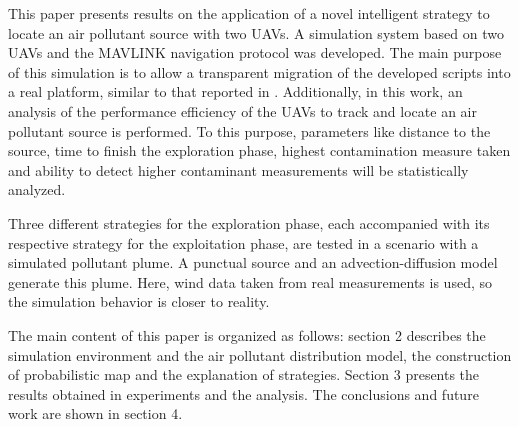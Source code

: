 This paper presents results on the application of a novel intelligent strategy to locate an air pollutant source with two UAVs.
A simulation system based on two UAVs and the MAVLINK navigation protocol \cite{koubaa2019micro} was developed. 
The main purpose of this simulation is to allow a transparent migration of the developed scripts into a real platform, similar to that reported in \cite{yungaicela2017design}.
Additionally, in this work, an analysis of the performance efficiency of the UAVs to track and locate an air pollutant source is performed.
To this purpose, parameters like distance to the source, time to finish the exploration phase, highest contamination measure taken and ability to detect higher contaminant measurements will be statistically analyzed.   

Three different strategies for the exploration phase, each accompanied with its respective strategy for the exploitation phase, are tested in a scenario with a simulated pollutant plume. 
A punctual source and an advection-diffusion model generate this plume.
Here, wind data taken from real measurements is used, so the simulation behavior is closer to reality.

The main content of this paper is organized as follows: section 2 describes the simulation environment and the air pollutant distribution model, the construction of probabilistic map and the explanation of strategies. Section 3 presents the results obtained in experiments and the analysis. The conclusions and future work are shown in section 4.


